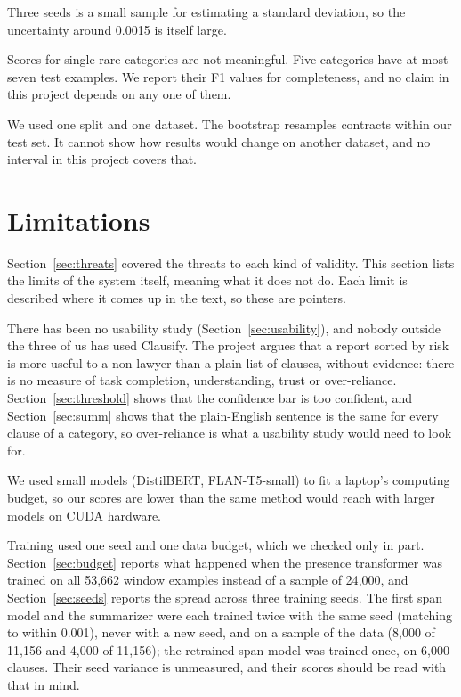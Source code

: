 Three seeds is a small sample for estimating a standard deviation, so the uncertainty around 0.0015 is itself large.

Scores for single rare categories are not meaningful. Five categories have at most seven test examples. We report their F1 values for completeness, and no claim in this project depends on any one of them.

We used one split and one dataset. The bootstrap resamples contracts within our test set. It cannot show how results would change on another dataset, and no interval in this project covers that.

\section{Limitations}
\label{sec:limitations}
Section~\ref{sec:threats} covered the threats to each kind of validity. This section lists the limits of the system itself, meaning what it does not do. Each limit is described where it comes up in the text, so these are pointers.

There has been no usability study (Section~\ref{sec:usability}), and nobody outside the three of us has used Clausify. The project argues that a report sorted by risk is more useful to a non-lawyer than a plain list of clauses, without evidence: there is no measure of task completion, understanding, trust or over-reliance. Section~\ref{sec:threshold} shows that the confidence bar is too confident, and Section~\ref{sec:summ} shows that the plain-English sentence is the same for every clause of a category, so over-reliance is what a usability study would need to look for.

We used small models (DistilBERT, FLAN-T5-small) to fit a laptop's computing budget, so our scores are lower than the same method would reach with larger models on CUDA hardware.

Training used one seed and one data budget, which we checked only in part. Section~\ref{sec:budget} reports what happened when the presence transformer was trained on all 53{,}662 window examples instead of a sample of 24{,}000, and Section~\ref{sec:seeds} reports the spread across three training seeds. The first span model and the summarizer were each trained twice with the same seed (matching to within 0.001), never with a new seed, and on a sample of the data (8{,}000 of 11{,}156 and 4{,}000 of 11{,}156); the retrained span model was trained once, on 6{,}000 clauses. Their seed variance is unmeasured, and their scores should be read with that in mind.

